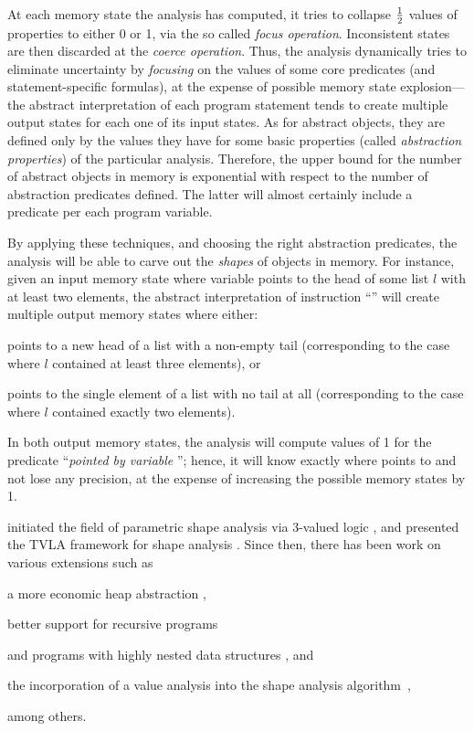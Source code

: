 At each memory state the analysis has computed, it tries to collapse
\(1\over{2}\) values of properties to either 0 or 1, via the so called
\emph{focus operation}. Inconsistent states are then discarded at the
\emph{coerce operation}. Thus, the analysis dynamically tries to
eliminate uncertainty by \emph{focusing} on the values of some core
predicates (and statement-specific formulas), at the expense of
possible memory state explosion---the abstract interpretation of each
program statement tends to create multiple output states for each one
of its input states.  As for abstract objects, they are defined only
by the values they have for some basic properties (called
\emph{abstraction properties}) of the particular analysis. Therefore,
the upper bound for the number of abstract objects in memory is
exponential with respect to the number of abstraction predicates
defined. The latter will almost certainly include a predicate per each
program variable.

By applying these techniques, and choosing the right abstraction
predicates, the analysis will be able to carve out the \emph{shapes}
of objects in memory. For instance, given an input memory state where
variable  points to the head of some list \(l\) with at least
two elements, the abstract interpretation of instruction ``'' will create multiple output memory states where either:
\begin{inparaenum}[(i)]
\item {} points to a new head of a list with a non-empty tail
  (corresponding to the case where \(l\) contained at least three
  elements), or
\item {} points to the single element of a list with no tail at
  all (corresponding to the case where \(l\) contained exactly two
  elements).
\end{inparaenum}
In both output memory states, the analysis will compute values of 1
for the predicate ``\emph{pointed by variable }''; hence, it
will know exactly where  points to and not lose any precision,
at the expense of increasing the possible memory states by 1.

\citeauthor{popl/SagivRW99} initiated the field of parametric shape
analysis via 3-valued logic
\cite{toplas/SagivRW98,popl/SagivRW99,toplas/SagivRW02}, and
\citeauthor{sas/Lev-AmiS00} presented the TVLA framework for shape
analysis \cite{sas/Lev-AmiS00}. Since then, there has been work on
various extensions such as
\begin{inparablank}
\item a more economic heap abstraction \cite{sas/ManevichSRF04},
\item better support for recursive programs \cite{cc/RinetzkyS01}
\item and programs with highly nested data structures
  \cite{cav/BerdineCCDOWY07} , and
\item the incorporation of a value analysis into the shape analysis
  algorithm~\cite{sefm/FerraraFJ12},
\end{inparablank}
among others.


